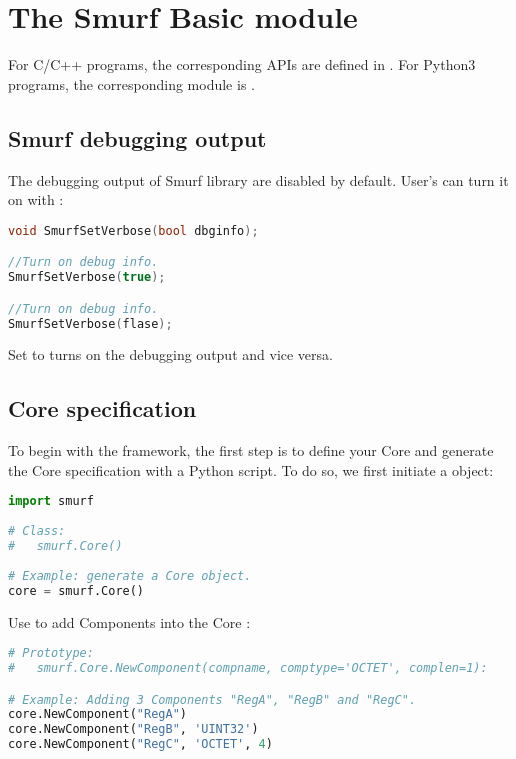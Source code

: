 \section{The Smurf Basic module\label{sec:SmurfBasic}}
For C/C++ programs, the corresponding APIs are defined in . For Python3 programs, the corresponding module is .

\subsection{Smurf debugging output}
The debugging output of Smurf library are disabled by default. User's can turn it on with :
\begin{lstlisting}[language=C++, caption={SmurfSetVerbose()\label{api:SmurfSetVerboseC}}]
void SmurfSetVerbose(bool dbginfo);

//Turn on debug info.
SmurfSetVerbose(true);

//Turn on debug info.
SmurfSetVerbose(flase);
\end{lstlisting}
Set  to  turns on the debugging output and vice versa.

\subsection{Core specification\label{api:Smurf.Core}}
To begin with the \smurf framework, the first step is to define your Core and generate the Core specification with a Python script. To do so, we first initiate a  object:
\begin{lstlisting}[language=Python,caption={smurf.Core()\label{api:smurf.CoreP}}]
import smurf
	
# Class:
#	smurf.Core()
	
# Example: generate a Core object.
core = smurf.Core()
\end{lstlisting}

Use  to add Components into the Core :
\begin{lstlisting}[language=Python,caption={smurf.Core.NewComponent()\label{api:Core.NewComponentP}}]
# Prototype:
#	smurf.Core.NewComponent(compname, comptype='OCTET', complen=1):

# Example: Adding 3 Components "RegA", "RegB" and "RegC".
core.NewComponent("RegA")
core.NewComponent("RegB", 'UINT32')
core.NewComponent("RegC", 'OCTET', 4)
\end{lstlisting}

